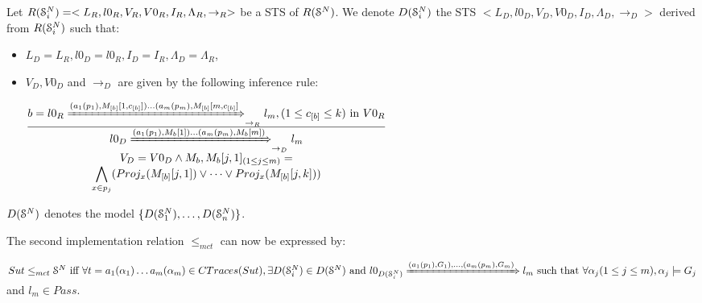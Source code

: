 
\begin{definition}
    Let $R(\EuScript{S}_i^{N})=<L_R,l0_R,V_R,V0_R,I_R,\Lambda_R,\rightarrow_R>$ be a STS of $R(\EuScript{S}^{N})$. We denote $D(\EuScript{S}_i^{N})$ the STS $ <L_D,l0_D,V_D,V0_D,I_D,\Lambda_D,\rightarrow_D>$ derived from $R(\EuScript{S}_i^{N})$ such that:
\begin{itemize}
    \item $L_D=L_{R}, l0_D=l0_{R}, I_D=I_{R}, \Lambda_D=\Lambda_{R}$,
    \item $V_D, V0_D$ and $\rightarrow_D$ are given by the following inference rule:

				$\frac{
					\begin{matrix}
					b=l0_{R}
					\xRightarrow{(a_1(p_1),M_{[b]}[1,c_{[b]}])\dots (a_m(p_m),M_{[b]}[m,c_{[b]}]}_{\rightarrow_{R}}
					l_{m},
					(1 \leq c_{[b]} \leq k) \text{ in } V0_{R}
					\end{matrix}
				}
				{
					\begin{matrix}
					l0_D
					\xRightarrow{(a_1(p_1),M_b[1])\dots (a_m(p_m),M_b[m])}_{\rightarrow_D}
					l_m\\
					V_D=V0_D \wedge M_b, M_b[j, 1]_{(1\leq j \leq m)} =\\
					 \displaystyle \bigwedge_{x \in p_j} ( Proj_x(M_{[b]}[j, 1]) \vee \dots \vee Proj_x(M_{[b]}[j, k]))



					\end{matrix}
				}$
  \end{itemize}

    $D(\EuScript{S}^{N})$ denotes the model $\{D(\EuScript{S}_1^{N}),\dots,D(\EuScript{S}_n^{N}) \}$.
\end{definition}


The second implementation relation $\leq_{mct}$ can now be
expressed by:

\begin{proposition}
    ${Sut} \leq_{mct} \EuScript{S}^{N} \text{ iff }\forall t=
    a_1(\alpha_1) \dots a_m(\alpha_m) \in CTraces({Sut}), \exists
    D(\EuScript{S}_i^{N}) \in D(\EuScript{S}^{N}) \text{ and }
    l0_{D(\EuScript{S}_i^{N})}
    \xRightarrow{(a_1(p_1),G_{1}),\dots,(a_m(p_m),G_{m})} l_m
    \text{ such that } \forall \alpha_j (1 \leq j \leq m),
    \alpha_j \models G_{j}$ and $l_m \in Pass$.
\end{proposition}


